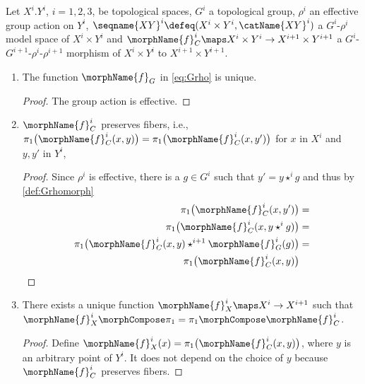 \documentclass{article}
\begin{document}
\begin{lemma}
\label{lem:Grhomorph}
Let $X^i.Y^i$, $i=1,2,3$, be topological spaces, $G^i$ a topological
group, $\rho^i$ an effective group action on $Y^i$,
\nobreaks
{{
  $\seqname{XY}^i \defeq (X^i \times Y^i, \catName{XY}^i)$
}}
a $G^i$-$\rho^i$ model space of $X^i \times Y^i$ and
$\morphName{f}^i_C \maps X^i \times Y^i \to X^{i+1} \times Y^{i+1}$ a
$G^i$-$G^{i+1}$-$\rho^i$-$\rho^{i+1}$ morphism of $X^i \times Y^i$ to
$X^{i+1} \times Y^{i+1}$.

\begin{enumerate}
\item
\label{grhomorph:fgunique}
The function $\morphName{f}_G$ in \cref{eq:Grho} is unique.

\begin{proof}
The group action is effective.
\end{proof}

\item
\label{grhomorph:fiber}
$\morphName{f}^i_C$ preserves fibers, i.e.,
$
  \pi_1 \bigl ( \morphName{f}^i_C(x,y) \bigr ) =
  \pi_1 \bigl ( \morphName{f}^i_C(x,y') \bigr )
$
for $x$ in $X^i$ and $y,y'$ in $ Y^i$,
\begin{proof}
Since $\rho^i$ is effective, there is a $g \in G^i$ such that
$y' = y \star^i g$ and thus by \cref{def:Grhomorph}
\begin{equation}
\begin{split}
  \pi_1 \bigl ( \morphName{f}^i_C(x,y') \bigr )
  & =
\\
  \pi_1 \bigl ( \morphName{f}^i_C(x,y \star^i g) \bigr )
  & =
\\
  \pi_1 \bigl ( \morphName{f}^i_C(x,y) \star^{i+1} \morphName{f}^i_G(g) \bigr )
  & =
\\
  \pi_1 \bigl ( \morphName{f}^i_C(x,y) \bigr )
\end{split}
\end{equation}
\end{proof}

\item
\label{grhomorph:fxunique}
There exists a unique function $\morphName{f}^i_X \maps X^i \to X^{i+1}$
such that
$\morphName{f}^i_X \morphCompose \pi_1 = \pi_1 \morphCompose \morphName{f}^i_C$.

\begin{proof}
Define
$\morphName{f}^i_X(x) = \pi_1 \bigl ( \morphName{f}^i_C(x,y) \bigr )$,
where $y$ is an arbitrary point of $Y^i$. It does not depend on the
choice of $y$ because $\morphName{f}^i_C$ preserves fibers.
\end{proof}


\end{enumerate}
\end{lemma}
\end{document}
